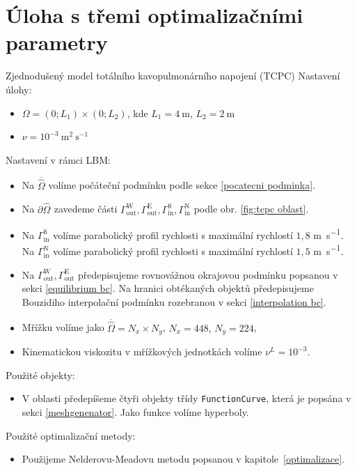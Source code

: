 \section{Úloha s třemi optimalizačními parametry}

\begin{uloha}{Zjednodušený model totálního kavopulmonárního napojení (TCPC)}\label{ulo:4}
	\vspace{2mm}
	Nastavení úlohy:
	\begin{itemize}
		\item $ \Omega=(0 ; L_1) \times(0 ; L_2)$, kde $ L_1 = 4 \mathrm{~m}$, $ L_2 = 2\mathrm{~m} $
		\item $ \nu=10^{-3} \mathrm{~m}^{2} \mathrm{~s}^{-1}$
	\end{itemize} 
	Nastavení v rámci LBM:
	\begin{itemize}
		\item Na $ \overline{\hat{\Omega}} $ volíme počáteční podmínku podle sekce \ref{pocatecni podminka}.
		\item Na $ \partial \hat{\Omega}_{} $ zavedeme části $ \Gamma^{\mathrm{W}}_{\mathrm{out}}, \Gamma^{\mathrm{E}}_{\mathrm{out}}, \Gamma^{\mathrm{S}}_{\mathrm{in}}, \Gamma^{\mathrm{N}}_{\mathrm{in}} $ podle obr. \ref{fig:tcpc oblast}.
		\item Na $ \Gamma^{\mathrm{S}}_{\mathrm{in}} $ volíme parabolický profil rychlosti s maximální rychlostí $ 1{,}8 $ \si{m s^{-1}}. Na $ \Gamma^{\mathrm{N}}_{\mathrm{in}} $ volíme parabolický profil rychlosti s maximální rychlostí $ 1{,}5 $ \si{m s^{-1}}.
		\item Na $ \Gamma^{\mathrm{W}}_{\mathrm{out}}, \Gamma^{\mathrm{E}}_{\mathrm{out}} $ předepisujeme rovnovážnou okrajovou podmínku popsanou v sekci \ref{equilibrium bc}. Na hranici obtékaných objektů předepisujeme Bouzidiho interpolační podmínku rozebranou v sekci \ref{interpolation bc}. 
		
		\item Mřížku volíme jako $\overline{\hat{\Omega}} = N_{x} \times N_{y}$, $N_{x} = 448, \, N_{y} = 224$,
		\item Kinematickou viskozitu v mřížkových jednotkách volíme $\nu^{L} = 10^{-3} $.
	\end{itemize}
	Použité objekty:
	\begin{itemize}
		\item V oblasti předepíšeme čtyři objekty třídy \texttt{FunctionCurve}, která je popsána v sekci \ref{meshgenenator}. Jako funkce volíme hyperboly.
	\end{itemize} 
	Použité optimalizační metody:
	\begin{itemize}
		\item Použijeme Nelderovu-Meadovu metodu popsanou v kapitole~\ref{optimalizace}.
	\end{itemize} 
\end{uloha}
